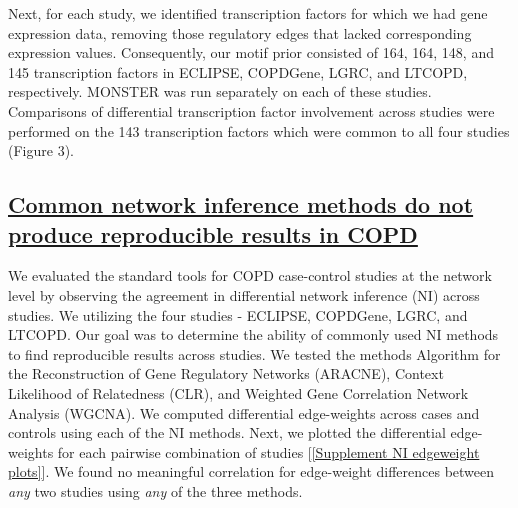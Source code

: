 \documentclass[english]{article}
\begin{document}
Next, for each study, we identified transcription factors for which
we had gene expression data, removing those regulatory edges that
lacked corresponding expression values. Consequently, our motif prior
consisted of 164, 164, 148, and 145 transcription factors in ECLIPSE,
COPDGene, LGRC, and LTCOPD, respectively. MONSTER was run separately
on each of these studies. Comparisons of differential transcription
factor involvement across studies were performed on the 143 transcription
factors which were common to all four studies (Figure 3).


\subsection*{\uline{Common network inference methods do not produce reproducible
results in COPD}}

We evaluated the standard tools for COPD case-control studies at the
network level by observing the agreement in differential network inference
(NI) across studies. We utilizing the four studies - ECLIPSE, COPDGene,
LGRC, and LTCOPD. Our goal was to determine the ability of commonly
used NI methods to find reproducible results across studies. We tested
the methods Algorithm for the Reconstruction of Gene Regulatory Networks
(ARACNE), Context Likelihood of Relatedness (CLR), and Weighted Gene
Correlation Network Analysis (WGCNA). We computed differential edge-weights
across cases and controls using each of the NI methods. Next, we plotted
the differential edge-weights for each pairwise combination of studies
{[}\ref{Supplement NI edgeweight plots}{]}. We found no meaningful
correlation for edge-weight differences between \emph{any} two studies
using \emph{any} of the three methods. 
\end{document}
